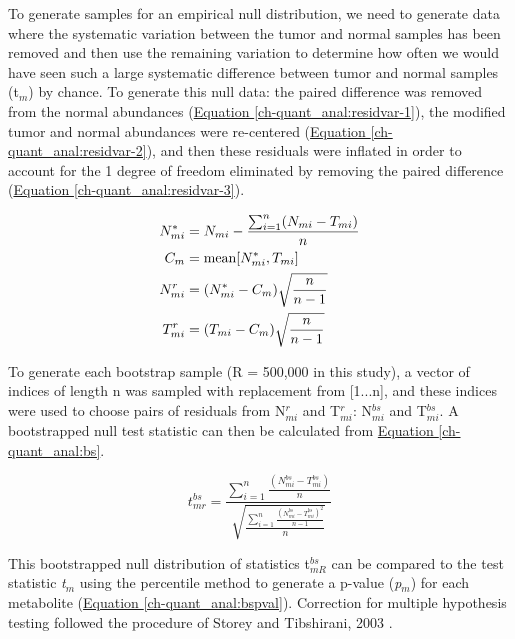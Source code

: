 To generate samples for an empirical null distribution, we need to generate data where the systematic variation between the tumor and normal samples has been removed and then use the remaining variation to determine how often we would have seen such a large systematic difference between tumor and normal samples (t$_{m}$) by chance.  To generate this null data: the paired difference was removed from the normal abundances (\hyperref[ch-quant_anal:residvar-1]{Equation \ref{ch-quant_anal:residvar-1}}), the modified tumor and normal abundances were re-centered (\hyperref[ch-quant_anal:residvar-2]{Equation \ref{ch-quant_anal:residvar-2}}), and then these residuals were inflated in order to account for the 1 degree of freedom eliminated by removing the paired difference (\hyperref[ch-quant_anal:residvar-3]{Equation \ref{ch-quant_anal:residvar-3}}).

\begin{subequations}
\begin{align}
N^{*}_{mi} &= N_{mi} - \frac{\sum_{i = 1}^{n}(N_{mi} - T_{mi})}{n}\label{ch-quant_anal:residvar-1}\\
C_{m} &= \text{mean}[N^{*}_{mi}, T_{mi}]\label{ch-quant_anal:residvar-2}\\
N^{r}_{mi} &= (N^{*}_{mi} - C_{m})\sqrt{\frac{n}{n - 1}}\notag\\
T^{r}_{mi} &= (T_{mi} - C_{m})\sqrt{\frac{n}{n - 1}}\label{ch-quant_anal:residvar-3}
\end{align}
\end{subequations}


To generate each bootstrap sample (R = 500,000 in this study), a vector of indices of length n was sampled with replacement from [1...n], and these indices were used to choose pairs of residuals from N$^{r}_{mi}$ and T$^{r}_{mi}$: N$^{bs}_{mi}$ and T$^{bs}_{mi}$.  A bootstrapped null test statistic can then be calculated from \hyperref[ch-quant_anal:bs]{Equation \ref{ch-quant_anal:bs}}.

\begin{equation}
t^{bs}_{mr} = \frac{\sum_{i = 1}^{n}\frac{(N^{bs}_{mi} - T^{bs}_{mi})}{n}}{\sqrt{\frac{\sum_{i = 1}^{n}\frac{(N^{bs}_{mi} - T^{bs}_{mi})^{2}}{n-1}}{n}}}\label{ch-quant_anal:bs}
\end{equation}

This bootstrapped null distribution of statistics t$^{bs}_{mR}$ can be compared to the test statistic \textit{t}$_{m}$ using the percentile method to generate a p-value (\textit{p}$_{m}$) for each metabolite (\hyperref[ch-quant_anal:bspval]{Equation \ref{ch-quant_anal:bspval}}). Correction for multiple hypothesis testing followed the procedure of Storey and Tibshirani, 2003 \cite{Storey:2003cj}.

